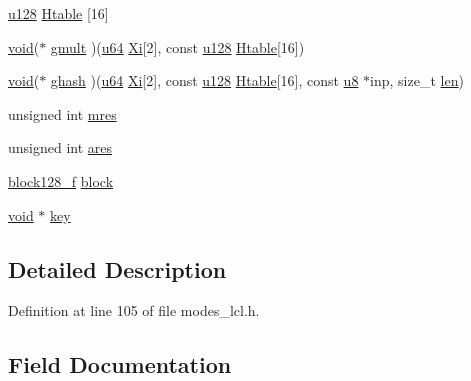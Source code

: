 \begin{DoxyCompactItemize}
\begin{tabbing}
\end{tabbing}\item 
\hyperlink{structu128}{u128} \hyperlink{structgcm128__context_a9bf17e349eb0ed58f0d87c09c31c5638}{Htable} \mbox{[}16\mbox{]}
\item 
\hyperlink{hw__4758__cca_8h_afad4d591c7931ff6dc5bf69c76c96aa0}{void}($\ast$ \hyperlink{structgcm128__context_a4e1d8ef99e397014653f47916ccba265}{gmult} )(\hyperlink{modes__lcl_8h_ad758b7a5c3f18ed79d2fcd23d9f16357}{u64} \hyperlink{structgcm128__context_a3a38cd4079c17d2893bdde19035ff2f1}{Xi}\mbox{[}2\mbox{]}, const \hyperlink{structu128}{u128} \hyperlink{structgcm128__context_a9bf17e349eb0ed58f0d87c09c31c5638}{Htable}\mbox{[}16\mbox{]})
\item 
\hyperlink{hw__4758__cca_8h_afad4d591c7931ff6dc5bf69c76c96aa0}{void}($\ast$ \hyperlink{structgcm128__context_af02c58fd6e410c047d2d13bb347d7cb3}{ghash} )(\hyperlink{modes__lcl_8h_ad758b7a5c3f18ed79d2fcd23d9f16357}{u64} \hyperlink{structgcm128__context_a3a38cd4079c17d2893bdde19035ff2f1}{Xi}\mbox{[}2\mbox{]}, const \hyperlink{structu128}{u128} \hyperlink{structgcm128__context_a9bf17e349eb0ed58f0d87c09c31c5638}{Htable}\mbox{[}16\mbox{]}, const \hyperlink{aes__locl_8h_aed742c436da53c1080638ce6ef7d13de}{u8} $\ast$inp, size\+\_\+t \hyperlink{structgcm128__context_a2aa876b2520483f7ea5cab60204da030}{len})
\item 
unsigned int \hyperlink{structgcm128__context_a61af57265541d7d07a820f88293ea0e4}{mres}
\item 
unsigned int \hyperlink{structgcm128__context_a88b64631b422e7f0d512a6c6b66be004}{ares}
\item 
\hyperlink{include_2openssl_2modes_8h_a3be4f2f2fbba3b92b026d8072dd6c3ad}{block128\+\_\+f} \hyperlink{structgcm128__context_a59f10af1cb28ada84b1535c0270f51e4}{block}
\item 
\hyperlink{hw__4758__cca_8h_afad4d591c7931ff6dc5bf69c76c96aa0}{void} $\ast$ \hyperlink{structgcm128__context_ab5c000aec752f2206131e183daf5efbf}{key}
\end{DoxyCompactItemize}


\subsection{Detailed Description}


Definition at line 105 of file modes\+\_\+lcl.\+h.



\subsection{Field Documentation}
